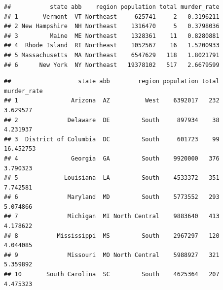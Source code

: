 \documentclass[
]{article}
\newenvironment{Shaded}{\begin{snugshade}}{\end{snugshade}}
\newcommand{\CommentTok}[1]{\textcolor[rgb]{0.56,0.35,0.01}{\textit{#1}}}
\newcommand{\DecValTok}[1]{\textcolor[rgb]{0.00,0.00,0.81}{#1}}
\newcommand{\KeywordTok}[1]{\textcolor[rgb]{0.13,0.29,0.53}{\textbf{#1}}}
\newcommand{\NormalTok}[1]{#1}
\newcommand{\OperatorTok}[1]{\textcolor[rgb]{0.81,0.36,0.00}{\textbf{#1}}}
\newcommand{\StringTok}[1]{\textcolor[rgb]{0.31,0.60,0.02}{#1}}
\begin{document}
\begin{Shaded}
\end{Shaded}

\begin{verbatim}
##           state abb    region population total murder_rate
## 1       Vermont  VT Northeast     625741     2   0.3196211
## 2 New Hampshire  NH Northeast    1316470     5   0.3798036
## 3         Maine  ME Northeast    1328361    11   0.8280881
## 4  Rhode Island  RI Northeast    1052567    16   1.5200933
## 5 Massachusetts  MA Northeast    6547629   118   1.8021791
## 6      New York  NY Northeast   19378102   517   2.6679599
\end{verbatim}

\begin{Shaded}
\end{Shaded}

\begin{verbatim}
##                   state abb        region population total murder_rate
## 1               Arizona  AZ          West    6392017   232    3.629527
## 2              Delaware  DE         South     897934    38    4.231937
## 3  District of Columbia  DC         South     601723    99   16.452753
## 4               Georgia  GA         South    9920000   376    3.790323
## 5             Louisiana  LA         South    4533372   351    7.742581
## 6              Maryland  MD         South    5773552   293    5.074866
## 7              Michigan  MI North Central    9883640   413    4.178622
## 8           Mississippi  MS         South    2967297   120    4.044085
## 9              Missouri  MO North Central    5988927   321    5.359892
## 10       South Carolina  SC         South    4625364   207    4.475323
\end{verbatim}

\begin{Shaded}
\end{Shaded}
\end{document}
